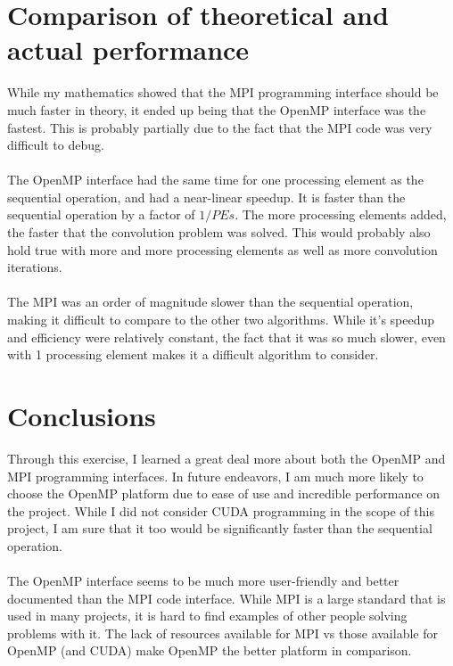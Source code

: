 \documentclass{article}
\begin{document}
\section*{Comparison of theoretical and actual performance}
\begin{par}
While my mathematics showed that the MPI programming interface should be much faster in theory, it ended up being that the OpenMP interface was the fastest.  This is probably partially due to the fact that the MPI code was very difficult to debug.\\
\\
The OpenMP interface had the same time for one processing element as the sequential operation, and had a near-linear speedup.  It is faster than the sequential operation by a factor of $1/PEs$.  The more processing elements added, the faster that the convolution problem was solved.  This would probably also hold true with more and more processing elements as well as more convolution iterations.\\
\\
The MPI was an order of magnitude slower than the sequential operation, making it difficult to compare to the other two algorithms.  While it's speedup and efficiency were relatively constant, the fact that it was so much slower, even with 1 processing element makes it a difficult algorithm to consider.
\end{par}

\section*{Conclusions}
\begin{par}
Through this exercise, I learned a great deal more about both the OpenMP and MPI programming interfaces.  In future endeavors, I am much more likely to choose the OpenMP platform due to ease of use and incredible performance on the project.  While I did not consider CUDA programming in the scope of this project, I am sure that it too would be significantly faster than the sequential operation.\\
\\
The OpenMP interface seems to be much more user-friendly and better documented than the MPI code interface.  While MPI is a large standard that is used in many projects, it is hard to find examples of other people solving problems with it.  The lack of resources available for MPI vs those available for OpenMP (and CUDA) make OpenMP the better platform in comparison.
\end{par}
\end{document}
